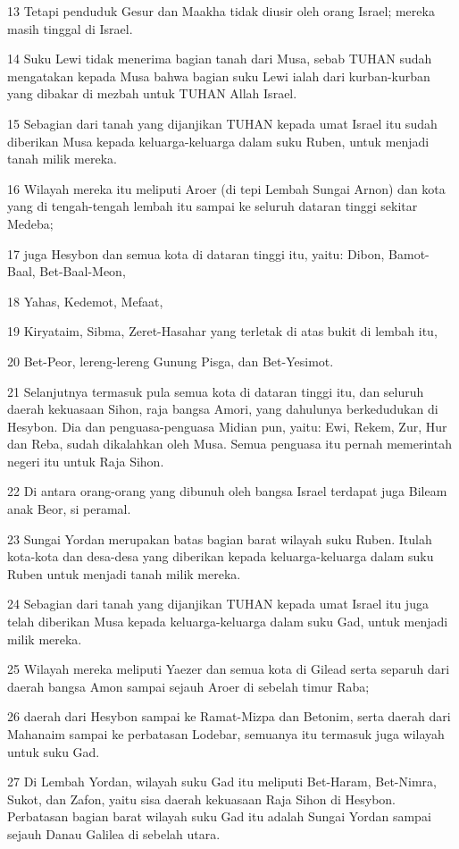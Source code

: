 \par 13 Tetapi penduduk Gesur dan Maakha tidak diusir oleh orang Israel; mereka masih tinggal di Israel.
\par 14 Suku Lewi tidak menerima bagian tanah dari Musa, sebab TUHAN sudah mengatakan kepada Musa bahwa bagian suku Lewi ialah dari kurban-kurban yang dibakar di mezbah untuk TUHAN Allah Israel.
\par 15 Sebagian dari tanah yang dijanjikan TUHAN kepada umat Israel itu sudah diberikan Musa kepada keluarga-keluarga dalam suku Ruben, untuk menjadi tanah milik mereka.
\par 16 Wilayah mereka itu meliputi Aroer (di tepi Lembah Sungai Arnon) dan kota yang di tengah-tengah lembah itu sampai ke seluruh dataran tinggi sekitar Medeba;
\par 17 juga Hesybon dan semua kota di dataran tinggi itu, yaitu: Dibon, Bamot-Baal, Bet-Baal-Meon,
\par 18 Yahas, Kedemot, Mefaat,
\par 19 Kiryataim, Sibma, Zeret-Hasahar yang terletak di atas bukit di lembah itu,
\par 20 Bet-Peor, lereng-lereng Gunung Pisga, dan Bet-Yesimot.
\par 21 Selanjutnya termasuk pula semua kota di dataran tinggi itu, dan seluruh daerah kekuasaan Sihon, raja bangsa Amori, yang dahulunya berkedudukan di Hesybon. Dia dan penguasa-penguasa Midian pun, yaitu: Ewi, Rekem, Zur, Hur dan Reba, sudah dikalahkan oleh Musa. Semua penguasa itu pernah memerintah negeri itu untuk Raja Sihon.
\par 22 Di antara orang-orang yang dibunuh oleh bangsa Israel terdapat juga Bileam anak Beor, si peramal.
\par 23 Sungai Yordan merupakan batas bagian barat wilayah suku Ruben. Itulah kota-kota dan desa-desa yang diberikan kepada keluarga-keluarga dalam suku Ruben untuk menjadi tanah milik mereka.
\par 24 Sebagian dari tanah yang dijanjikan TUHAN kepada umat Israel itu juga telah diberikan Musa kepada keluarga-keluarga dalam suku Gad, untuk menjadi milik mereka.
\par 25 Wilayah mereka meliputi Yaezer dan semua kota di Gilead serta separuh dari daerah bangsa Amon sampai sejauh Aroer di sebelah timur Raba;
\par 26 daerah dari Hesybon sampai ke Ramat-Mizpa dan Betonim, serta daerah dari Mahanaim sampai ke perbatasan Lodebar, semuanya itu termasuk juga wilayah untuk suku Gad.
\par 27 Di Lembah Yordan, wilayah suku Gad itu meliputi Bet-Haram, Bet-Nimra, Sukot, dan Zafon, yaitu sisa daerah kekuasaan Raja Sihon di Hesybon. Perbatasan bagian barat wilayah suku Gad itu adalah Sungai Yordan sampai sejauh Danau Galilea di sebelah utara.
